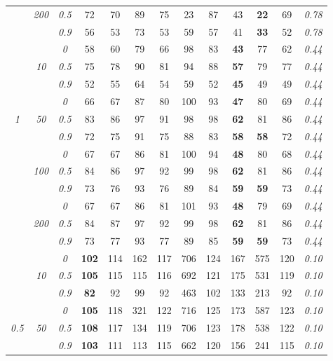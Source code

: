 \begin{table}
\begin{center}
\begin{tabular}{ccc|cc|cc|cc|cc|c|c}
 & \it  200  & \it  0.5  & 72 & 70 & 89 & 75 & 23 & 87 & 43 & {\bf 22} & 69 & \it  0.78 \\
& & \it  0.9  & 56 & 53 & 73 & 53 & 59 & 57 & 41 & {\bf 33} & 52 & \it  0.78 \\
\hline\rule{0pt}{3ex}
& & \it  0  & 58 & 60 & 79 & 66 & 98 & 83 & {\bf 43} & 77 & 62 & \it  0.44 \\
 & \it  10  & \it  0.5  & 75 & 78 & 90 & 81 & 94 & 88 & {\bf 57} & 79 & 77 & \it  0.44 \\
& & \it  0.9  & 52 & 55 & 64 & 54 & 59 & 52 & {\bf 45} & 49 & 49 & \it  0.44 \\[1ex]
\cline{2-3}\rule{0pt}{3ex}
& & \it  0  & 66 & 67 & 87 & 80 & 100 & 93 & {\bf 47} & 80 & 69 & \it  0.44 \\
\it  1  & \it  50  & \it  0.5  & 83 & 86 & 97 & 91 & 98 & 98 & {\bf 62} & 81 & 86 & \it  0.44 \\
& & \it  0.9  & 72 & 75 & 91 & 75 & 88 & 83 & {\bf 58} & {\bf 58} & 72 & \it  0.44 \\[1ex]
\cline{2-3}\rule{0pt}{3ex}
& & \it  0  & 67 & 67 & 86 & 81 & 100 & 94 & {\bf 48} & 80 & 68 & \it  0.44 \\
 & \it  100  & \it  0.5  & 84 & 86 & 97 & 92 & 99 & 98 & {\bf 62} & 81 & 86 & \it  0.44 \\
& & \it  0.9  & 73 & 76 & 93 & 76 & 89 & 84 & {\bf 59} & {\bf 59} & 73 & \it  0.44 \\[1ex]
\cline{2-3}\rule{0pt}{3ex}
& & \it  0  & 67 & 67 & 86 & 81 & 101 & 93 & {\bf 48} & 79 & 69 & \it  0.44 \\
 & \it  200  & \it  0.5  & 84 & 87 & 97 & 92 & 99 & 98 & {\bf 62} & 81 & 86 & \it  0.44 \\
& & \it  0.9  & 73 & 77 & 93 & 77 & 89 & 85 & {\bf 59} & {\bf 59} & 73 & \it  0.44 \\
\hline\rule{0pt}{3ex}
& & \it  0  & {\bf 102} & 114 & 162 & 117 & 706 & 124 & 167 & 575 & 120 & \it  0.10 \\
 & \it  10  & \it  0.5  & {\bf 105} & 115 & 115 & 116 & 692 & 121 & 175 & 531 & 119 & \it  0.10 \\
& & \it  0.9  & {\bf 82} & 92 & 99 & 92 & 463 & 102 & 133 & 213 & 92 & \it  0.10 \\[1ex]
\cline{2-3}\rule{0pt}{3ex}
& & \it  0  & {\bf 105} & 118 & 321 & 122 & 716 & 125 & 173 & 587 & 123 & \it  0.10 \\
\it  0.5  & \it  50  & \it  0.5  & {\bf 108} & 117 & 134 & 119 & 706 & 123 & 178 & 538 & 122 & \it  0.10 \\
& & \it  0.9  & {\bf 103} & 111 & 113 & 115 & 662 & 120 & 156 & 241 & 115 & \it  0.10 \\[1ex]

\end{tabular}
\end{center}
\end{table}
